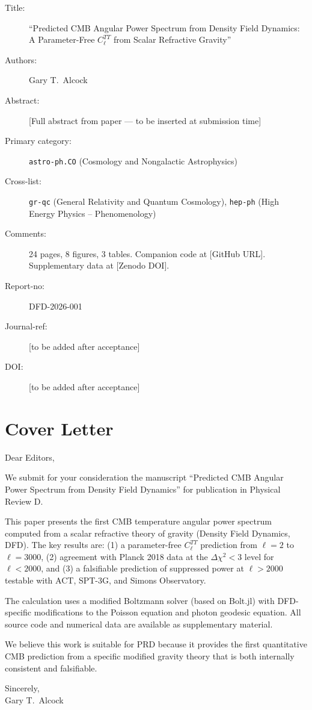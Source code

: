 \documentclass[11pt,a4paper]{article}
\begin{document}
\begin{tcolorbox}[colback=gray!5!white,colframe=gray!40!black,title=arXiv Submission Metadata]
\begin{description}
\item[Title:] ``Predicted CMB Angular Power Spectrum from Density Field Dynamics: A Parameter-Free $C_\ell^{TT}$ from Scalar Refractive Gravity''
\item[Authors:] Gary T.\ Alcock
\item[Abstract:] [Full abstract from paper --- to be inserted at submission time]
\item[Primary category:] \texttt{astro-ph.CO} (Cosmology and Nongalactic Astrophysics)
\item[Cross-list:] \texttt{gr-qc} (General Relativity and Quantum Cosmology), \texttt{hep-ph} (High Energy Physics -- Phenomenology)
\item[Comments:] 24 pages, 8 figures, 3 tables. Companion code at [GitHub URL]. Supplementary data at [Zenodo DOI].
\item[Report-no:] DFD-2026-001
\item[Journal-ref:] [to be added after acceptance]
\item[DOI:] [to be added after acceptance]
\end{description}
\end{tcolorbox}

\section{Cover Letter}

\begin{tcolorbox}[colback=blue!3!white,colframe=blue!30!black,title=Cover Letter (for journal submission)]
\small
Dear Editors,

We submit for your consideration the manuscript ``Predicted CMB Angular Power Spectrum from Density Field Dynamics'' for publication in Physical Review D.

This paper presents the first CMB temperature angular power spectrum computed from a scalar refractive theory of gravity (Density Field Dynamics, DFD). The key results are: (1) a parameter-free $C_\ell^{TT}$ prediction from $\ell = 2$ to $\ell = 3000$, (2) agreement with Planck 2018 data at the $\Delta\chi^2 < 3$ level for $\ell < 2000$, and (3) a falsifiable prediction of suppressed power at $\ell > 2000$ testable with ACT, SPT-3G, and Simons Observatory.

The calculation uses a modified Boltzmann solver (based on Bolt.jl) with DFD-specific modifications to the Poisson equation and photon geodesic equation. All source code and numerical data are available as supplementary material.

We believe this work is suitable for PRD because it provides the first quantitative CMB prediction from a specific modified gravity theory that is both internally consistent and falsifiable.

Sincerely,\\
Gary T.\ Alcock
\end{tcolorbox}
\end{document}
